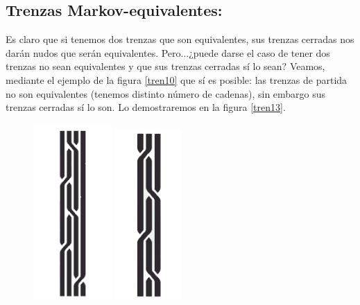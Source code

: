 \newpage
\begin{center}
	\subsection{Trenzas Markov-equivalentes:}
\end{center}
Es claro que si tenemos dos trenzas que son equivalentes, sus trenzas cerradas nos darán nudos que serán equivalentes. Pero...¿puede darse el caso de tener dos trenzas no sean equivalentes y que sus trenzas cerradas sí lo sean? Veamos, mediante el ejemplo de la figura \ref{tren10} que sí es posible: las trenzas de partida no son equivalentes (tenemos distinto número de cadenas), sin embargo sus trenzas cerradas sí lo son. Lo demostraremos en la figura \ref{tren13}.\\
\begin{figure}[h!]
	\centering
	\includegraphics[width=3cm]{itrenzas/t1pro.png}
	\includegraphics[width=2.5cm]{itrenzas/t2pro.png}
	

\end{figure}
